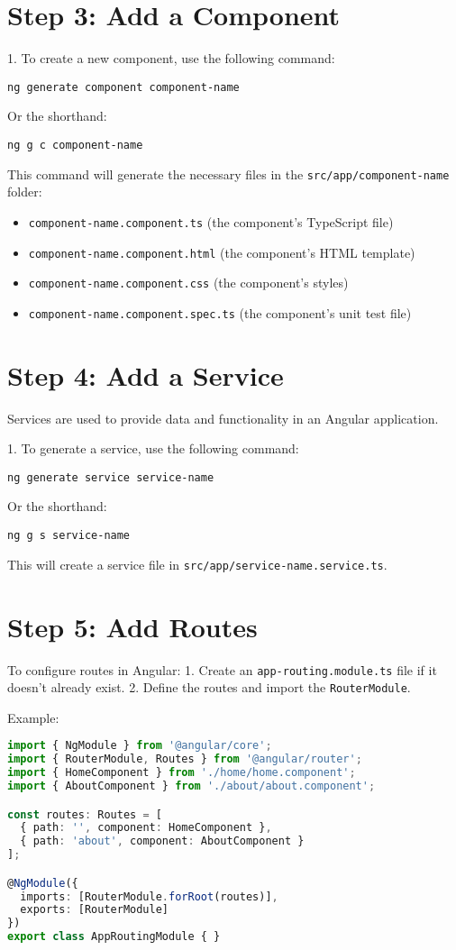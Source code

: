 \documentclass{article}
\begin{document}
\section*{Step 3: Add a Component}
1. To create a new component, use the following command:
\begin{verbatim}
ng generate component component-name
\end{verbatim}
Or the shorthand:
\begin{verbatim}
ng g c component-name
\end{verbatim}

This command will generate the necessary files in the \texttt{src/app/component-name} folder:
\begin{itemize}
    \item \texttt{component-name.component.ts} (the component's TypeScript file)
    \item \texttt{component-name.component.html} (the component's HTML template)
    \item \texttt{component-name.component.css} (the component's styles)
    \item \texttt{component-name.component.spec.ts} (the component's unit test file)
\end{itemize}

\section*{Step 4: Add a Service}
Services are used to provide data and functionality in an Angular application.

1. To generate a service, use the following command:
\begin{verbatim}
ng generate service service-name
\end{verbatim}
Or the shorthand:
\begin{verbatim}
ng g s service-name
\end{verbatim}

This will create a service file in \texttt{src/app/service-name.service.ts}.

\section*{Step 5: Add Routes}
To configure routes in Angular:
1. Create an \texttt{app-routing.module.ts} file if it doesn't already exist.
2. Define the routes and import the \texttt{RouterModule}.

Example:
\begin{lstlisting}[language=TypeScript, caption={Defining Routes in Angular}, label={lst:typescript-routes}]
import { NgModule } from '@angular/core';
import { RouterModule, Routes } from '@angular/router';
import { HomeComponent } from './home/home.component';
import { AboutComponent } from './about/about.component';

const routes: Routes = [
  { path: '', component: HomeComponent },
  { path: 'about', component: AboutComponent }
];

@NgModule({
  imports: [RouterModule.forRoot(routes)],
  exports: [RouterModule]
})
export class AppRoutingModule { }
\end{lstlisting}
\end{document}
